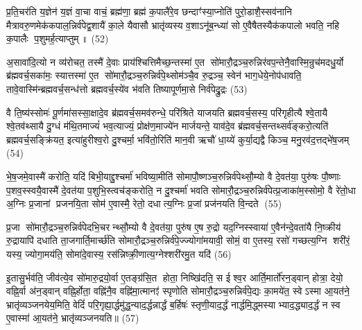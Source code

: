 प्र॒ति॒चर॑ति य॒ज्ञेन॑ य॒ज्ञं वा॒चा वाचं॒ ब्रह्म॑णा॒ ब्रह्म॑ क॒पालै॑रे॒व छन्दाꣳ॑स्या॒प्नोति॑ पुरो॒डाशै॒स्सव॑नानि मैत्रावरु॒णमेक॑कपाल॒न्निर्व॑पेद्व॒शायै॑ का॒ले यैवासौ भ्रातृ॑व्यस्य व॒शाऽनू॑ब॒न्ध्या॑ सो ए॒वैषैतस्यैक॑कपालो भवति॒ नहि क॒पालैः प॒शुमर्\mbox{}ह॒त्याप्तुम्॥ (52)

{\anuvakamend[{ब्रह्म॑णै॒वैन॑म॒भिच॑रति य॒ज्ञो न तावे॒वास्येन्द्रि॒यमाप्नोति दे॒वतास्स॒प्तत्रिꣳ॑शच्च।9।}]}

अ॒सावा॑दि॒त्यो न व्य॑रोचत॒ तस्मै॑ दे॒वाः प्राय॑श्चित्तिमैच्छ॒न्तस्मा॑ ए॒त सो॑मारौ॒द्रञ्च॒रुन्निर॑वप॒न्तेनै॒वास्मि॒न्रुच॑मदधु॒र्यो ब्र॑ह्मवर्च॒सका॑मः॒ स्यात्तस्मा॑ ए॒त सो॑मारौ॒द्रञ्च॒रुन्निर्व॑पे॒थ्सोम॑ञ्चै॒व रु॒द्रञ्च॒ स्वेन॑ भाग॒धेये॒नोप॑धावति॒ तावे॒वास्मि॑न्ब्रह्मवर्च॒सन्ध॑त्तो ब्रह्मवर्च॒स्ये॑व भ॑वति तिष्यापूर्णमा॒से निर्व॑पेद्रु॒द्रः (53)

वै ति॒ष्य॑स्सोमः॑ पू॒र्णमा॑सस्सा॒क्षादे॒व ब्र॑ह्मवर्च॒समव॑रुन्धे॒ परि॑श्रिते याजयति ब्रह्मवर्च॒सस्य॒ परि॑गृहीत्यै श्वे॒तायै श्वे॒तव॑थ्सायै दु॒ग्धं म॑थि॒तमाज्यं॑ भव॒त्याज्यं॒ प्रोक्ष॑ण॒माज्ये॑न मार्जयन्ते॒ याव॑दे॒व ब्र॑ह्मवर्च॒सन्तथ्सर्व॑ङ्करो॒त्यति॑ ब्रह्मवर्च॒सङ्क्रि॑यत॒ इत्या॑हुरीश्व॒रो दु॒श्चर्मा॒ भवि॑तो॒रिति॑ मान॒वी ऋचौ॑ धा॒य्ये॑ कुर्या॒द्यद्वै किञ्च॒ मनु॒रव॑द॒त्तद्भे॑ष॒जम् (54)

भे॒ष॒जमे॒वास्मै॑ करोति॒ यदि॑ बिभी॒याद्दु॒श्चर्मा॑ भविष्या॒मीति॑ सोमापौ॒ष्णञ्च॒रुन्निर्व॑पेथ्सौ॒म्यो वै दे॒वत॑या॒ पुरु॑षः पौ॒ष्णाः प॒शव॒स्स्वयै॒वास्मै॑ दे॒वत॑या प॒शुभि॒स्त्वच॑ङ्करोति॒ न दु॒श्चर्मा॑ भवति सोमारौ॒द्रञ्च॒रुन्निर्व॑पेत्प्र॒जाका॑म॒स्सोमो॒ वै रे॑तो॒धा अ॒ग्निः प्र॒जानां प्रजनयि॒ता सोम॑ ए॒वास्मै॒ रेतो॒ दधात्य॒ग्निः प्र॒जां प्रज॑नयति वि॒न्दते (55)

प्र॒जा सो॑मारौ॒द्रञ्च॒रुन्निर्व॑पेदभि॒चरन्थ्सौ॒म्यो वै दे॒वत॑या॒ पुरु॑ष ए॒ष रु॒द्रो यद॒ग्निस्स्वाया॑ ए॒वैन॑न्दे॒वता॑यै नि॒ष्क्रीय॑ रु॒द्रायापि॑ दधाति ता॒जगार्ति॒मार्च्छ॑ति सोमारौ॒द्रञ्च॒रुन्निर्व॑पे॒ज्ज्योगा॑मयावी॒ सोमं॒ वा ए॒तस्य॒ रसो॑ गच्छत्य॒ग्नि शरी॑रं॒ यस्य॒ ज्योगा॒मय॑ति॒ सोमा॑दे॒वास्य॒ रस॑न्निष्क्री॒णात्य॒ग्नेश्शरी॑रमु॒त यदि॑ (56)

इ॒तासु॒र्भव॑ति॒ जीव॑त्ये॒व सो॑मारु॒द्रयो॒र्वा ए॒तङ्ग्र॑सि॒त होता॒ निष्खि॑दति॒ स ईश्व॒र आर्ति॒मार्तो॑रन॒ड्वान् होत्रा॒ देयो॒ वह्नि॒र्वा अ॑न॒ड्वान् वह्नि॒र्\mbox{}होता॒ वह्नि॑नै॒व वह्नि॑मा॒त्मानꣵ॑ स्पृणोति सोमारौ॒द्रञ्च॒रुन्निर्व॑पे॒द्यः का॒मये॑त॒ स्वेऽस्मा आ॒यत॑ने॒ भ्रातृ॑व्यञ्जनयेय॒मिति॒ वेदिं॑ परि॒गृह्या॒र्द्धमु॑द्ध॒न्याद॒र्द्धन्नार्द्धं ब॒र्\mbox{}हिषः॑ स्तृणी॒याद॒र्द्धं नार्द्धमि॒द्ध्मस्याभ्याद॒द्ध्याद॒र्द्धं न स्व ए॒वास्मा॑ आ॒यत॑ने॒ भ्रातृ॑व्यञ्जनयति॥ (57)

